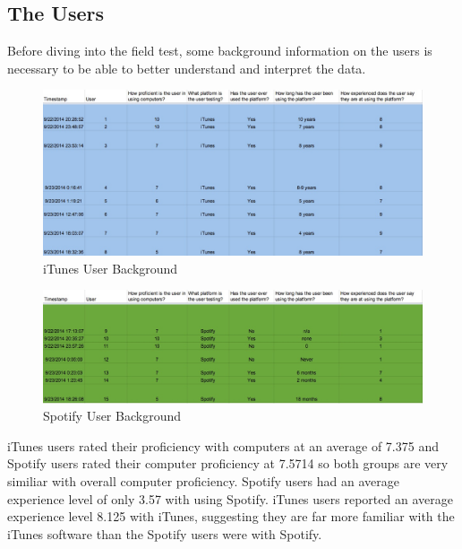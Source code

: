\documentclass[a4paper]{article}
\begin{document}
\subsection{The Users}
Before diving into the field test, some background information on the users is necessary to be able to better understand and interpret the data.
\begin{figure}[H]
\centering
\includegraphics[width=1\textwidth]{itunesuserbackground_copy.jpg}
\caption{\label{userdata: itunes}iTunes User Background}
\end{figure}
\begin{figure}[H]
\centering
\includegraphics[width=1\textwidth]{spotifyuserbackground_copy.jpg}
\caption{\label{userdata: spotify}Spotify User Background}
\end{figure}
iTunes users rated their proficiency with computers at an average of 7.375 and Spotify users rated their computer proficiency at 7.5714 so both groups are very similiar with overall computer proficiency. Spotify users had an average experience level of only 3.57 with using Spotify. iTunes users reported an average experience level 8.125 with iTunes, suggesting they are far more familiar with the iTunes software than the Spotify users were with Spotify. 
%
\end{document}
